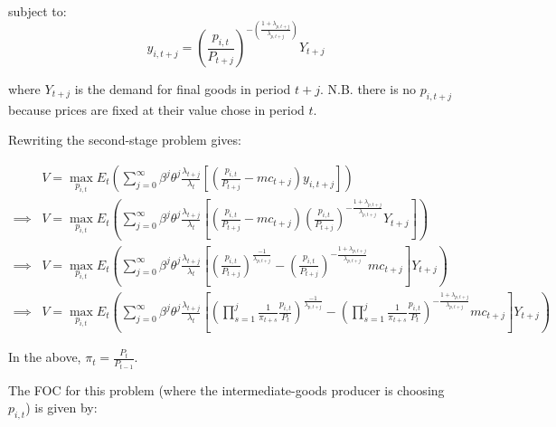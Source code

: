 \noindent\noindent subject to:
\begin{equation}
y_{i,t+j}=\left(\frac{p_{i,t}}{P_{t+j}}\right)^{-\left(\frac{1+\lambda_{p,t+j}}{\lambda_{p,t+j}}\right)}Y_{t+j}
\end{equation}

\noindent\noindent where $Y_{t+j}$ is the demand for final goods in period $t+j$.  N.B. there is no $p_{i,t+j}$ because prices are fixed at their value chose in period $t$.


Rewriting the second-stage problem gives:

\begin{equation}
\begin{split}
 & V=\max_{p_{i,t}} E_{t}\left(\sum_{j=0}^{\infty}\beta^{j}\theta^{j}\frac{\lambda_{t+j}}{\lambda_{t}}\left[\left(\frac{p_{i,t}}{P_{t+j}}-mc_{t+j}\right)y_{i,t+j}\right]\right)
\\
\implies & V=\max_{p_{i,t}} E_{t}\left(\sum_{j=0}^{\infty} \beta^{j}\theta^{j}\frac{\lambda_{t+j}}{\lambda_{t}}\left[\left(\frac{p_{i,t}}{P_{t+j}}-mc_{t+j}\right)\left(\frac{p_{i,t}}{P_{t+j}}\right)^{-\frac{1+\lambda_{p,t+j}}{\lambda_{p,t+j}}}Y_{t+j}\right]\right) \\
 \implies & V=\max_{p_{i,t}} E_{t}\left(\sum_{j=0}^{\infty} \beta^{j}\theta^{j}\frac{\lambda_{t+j}}{\lambda_{t}}\left[\left(\frac{p_{i,t}}{P_{t+j}}\right)^{\frac{-1}{\lambda_{p,t+j}}}-\left(\frac{p_{i,t}}{P_{t+j}}\right)^{-\frac{1+\lambda_{p,t+j}}{\lambda_{p,t+j}}}mc_{t+j}\right]Y_{t+j}\right) \\
 \implies & V=\max_{p_{i,t}} E_{t}\left(\sum_{j=0}^{\infty} \beta^{j}\theta^{j}\frac{\lambda_{t+j}}{\lambda_{t}}\left[\left(\prod_{s=1}^{j}\frac{1}{\pi_{t+s}}\frac{p_{i,t}}{P_{t}}\right)^{\frac{-1}{\lambda_{p,t+j}}}-\left(\prod_{s=1}^{j}\frac{1}{\pi_{t+s}}\frac{p_{i,t}}{P_{t}}\right)^{-\frac{1+\lambda_{p,t+j}}{\lambda_{p,t+j}}}mc_{t+j}\right]Y_{t+j}\right)
\end{split}
\end{equation}

In the above, $\pi_{t}=\frac{P_{t}}{P_{t-1}}$.

The FOC for this problem (where the intermediate-goods producer is choosing $p_{i,t}$) is given by:

